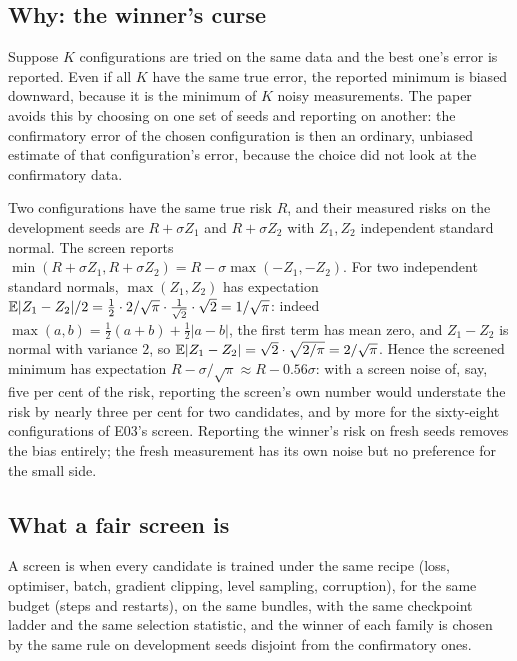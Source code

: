 \subsection{Why: the winner's curse}

Suppose $K$ configurations are tried on the same data and the best one's error is
reported. Even if all $K$ have the same true error, the reported minimum is biased
downward, because it is the minimum of $K$ noisy measurements. The paper avoids this by
choosing on one set of seeds and reporting on another: the confirmatory error of the
chosen configuration is then an ordinary, unbiased estimate of that configuration's
error, because the choice did not look at the confirmatory data.

\begin{example}
\label{ex:winners-curse}
Two configurations have the same true risk $R$, and their measured risks on the
development seeds are $R+\sigma Z_1$ and $R+\sigma Z_2$ with $Z_1,Z_2$ independent
standard normal. The screen reports $\min(R+\sigma Z_1,R+\sigma Z_2)=R-\sigma\max(-Z_1,-Z_2)$.
For two independent standard normals, $\max(Z_1,Z_2)$ has expectation
$\mathbb{E}|Z_1-Z_2|/2=\tfrac12\cdot2/\sqrt{\pi}\cdot\tfrac{1}{\sqrt2}\cdot\sqrt2=1/\sqrt\pi$: indeed
$\max(a,b)=\tfrac12(a+b)+\tfrac12|a-b|$, the first term has mean zero, and $Z_1-Z_2$ is
normal with variance $2$, so $\mathbb{E}|Z_1-Z_2|=\sqrt{2}\cdot\sqrt{2/\pi}=2/\sqrt\pi$. Hence the
screened minimum has expectation $R-\sigma/\sqrt\pi\approx R-0.56\sigma$: with a
screen noise of, say, five per cent of the risk, reporting the screen's own number
would understate the risk by nearly three per cent for two candidates, and by more for
the sixty-eight configurations of E03's screen. Reporting the winner's risk on fresh
seeds removes the bias entirely; the fresh measurement has its own noise but no
preference for the small side.
\end{example}

\subsection{What a fair screen is}

\begin{definition}
\label{def:fair-screen}
A screen is  when every candidate is trained under the same recipe (loss,
optimiser, batch, gradient clipping, level sampling, corruption), for the same budget
(steps and restarts), on the same bundles, with the same checkpoint ladder and the same
selection statistic, and the winner of each family is chosen by the same rule on
development seeds disjoint from the confirmatory ones.
\end{definition}

